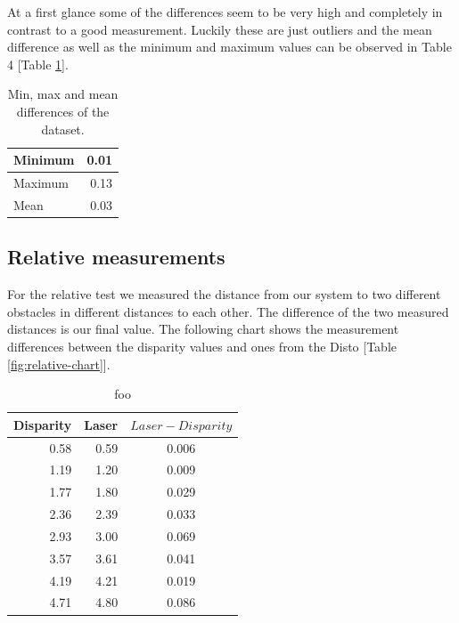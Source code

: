 \documentclass[11pt]{article}
\begin{document}
At a first glance some of the differences seem to be very high and completely in contrast to a good measurement. Luckily these are just outliers and the mean difference as well as the minimum and maximum values can be observed in Table 4 [Table \ref{table:absolute-results}].

\begin{table}[htbp]
	\begin{center}
	\begin{tabular}{|l|r|}
	\hline
	Minimum & 0.01 \\ \hline
	Maximum & 0.13 \\ \hline
	Mean & 0.03\\ \hline
	\end{tabular}
	\end{center}
	\caption{Min, max and mean differences of the dataset.}
	\label{table:absolute-results}
\end{table}

\subsection{Relative measurements}
For the relative test we measured the distance from our system to two different obstacles in different distances to each other. The difference of the two measured distances is our final value. The following chart shows the measurement differences between the disparity values and ones from the Disto [Table \ref{fig:relative-chart}].

\begin{table}[htbp]
	\begin{center}
	\begin{tabular}{|r|r|c|}
	\hline
	\multicolumn{1}{|l|}{Disparity} & \multicolumn{1}{l|}{Laser} & \multicolumn{1}{l|}{$Laser - Disparity$} \\ \hline
	0.58 & 0.59 & 0.006 \\ \hline
	1.19 & 1.20 & 0.009 \\ \hline
	1.77 & 1.80 & 0.029 \\ \hline
	2.36 & 2.39 & 0.033 \\ \hline
	2.93 & 3.00 & 0.069 \\ \hline
	3.57 & 3.61 & 0.041 \\ \hline
	4.19 & 4.21 & 0.019 \\ \hline
	4.71 & 4.80 & 0.086 \\ \hline
	\end{tabular}
	\end{center}
	\caption{foo}
	\label{table:relative-table}
\end{table}
\end{document}
